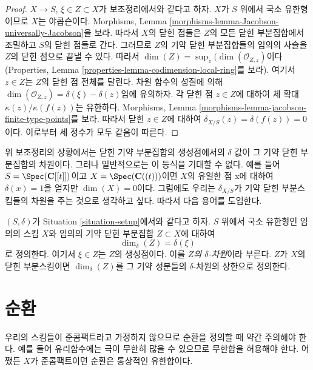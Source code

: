 \begin{proof}
$X \to S$, $\xi \in Z \subset X$가 보조정리에서와 같다고 하자.
$X$가 $S$ 위에서 국소 유한형이므로 $X$는 야콥슨이다. Morphisms,
Lemma \ref{morphisms-lemma-Jacobson-universally-Jacobson}을 보라.
따라서 $X$의 닫힌 점들은 $Z$의 모든 닫힌 부분집합에서 조밀하고
$S$의 닫힌 점들로 간다. 그러므로 $Z$의 기약 닫힌 부분집합들의 임의의
사슬을 $Z$의 닫힌 점으로 끝낼 수 있다. 따라서
$\dim(Z) = \sup_z(\dim(\mathcal{O}_{Z, z})$이다(Properties, Lemma
\ref{properties-lemma-codimension-local-ring}를 보라). 여기서
$z \in Z$는 $Z$의 닫힌 점 전체를 달린다. 차원 함수의 성질에 의해
$\dim(\mathcal{O}_{Z, z}) = \delta(\xi) - \delta(z)$임에 유의하자.
각 닫힌 점 $z \in Z$에 대하여 체 확대
$\kappa(z)/\kappa(f(z))$는 유한하다. Morphisms, Lemma
\ref{morphisms-lemma-jacobson-finite-type-points}를 보라. 따라서 닫힌
$z \in Z$에 대하여 $\delta_{X/S}(z) = \delta(f(z)) = 0$이다.
이로부터 세 정수가 모두 같음이 따른다.
\end{proof}

\noindent
위 보조정리의 상황에서는 닫힌 기약 부분집합의 생성점에서의
$\delta$ 값이 그 기약 닫힌 부분집합의 차원이다. 그러나 일반적으로는
이 등식을 기대할 수 없다. 예를 들어 $S = \Spec(\mathbf{C}[[t]])$이고
$X = \Spec(\mathbf{C}((t)))$이면 $X$의 유일한 점 x에 대하여
$\delta(x) = 1$을 얻지만 $\dim(X) = 0$이다. 그럼에도 우리는
$\delta_{X/S}$가 기약 닫힌 부분스킴들의 차원을 주는 것으로 생각하고
싶다. 따라서 다음 용어를 도입한다.

\begin{definition}
\label{definition-delta-dimension}
$(S, \delta)$가 Situation \ref{situation-setup}에서와 같다고 하자.
$S$ 위에서 국소 유한형인 임의의 스킴 $X$와 임의의 기약 닫힌 부분집합
$Z \subset X$에 대하여
$$
\dim_\delta(Z) = \delta(\xi)
$$
로 정의한다. 여기서 $\xi \in Z$는 $Z$의 생성점이다. 이를
{\it $Z$의 $\delta$-차원}이라 부른다. $Z$가 $X$의 닫힌 부분스킴이면
$\dim_\delta(Z)$를 그 기약 성분들의 $\delta$-차원의 상한으로 정의한다.
\end{definition}
\section{순환}
\label{section-cycles}

\noindent
우리의 스킴들이 준콤팩트라고 가정하지 않으므로 순환을 정의할 때
약간 주의해야 한다. 예를 들어 유리함수에는 극이 무한히 많을 수
있으므로 무한합을 허용해야 한다. 어쨌든 $X$가 준콤팩트이면 순환은
통상적인 유한합이다.

